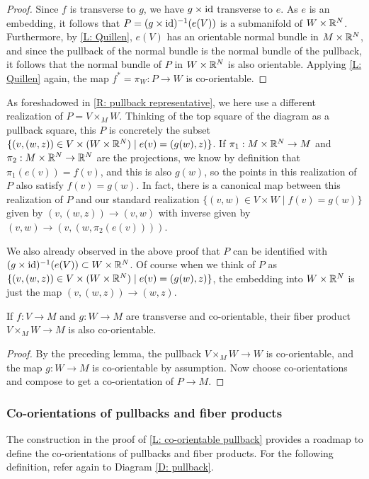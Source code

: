 \begin{proof}
Since $f$ is transverse to $g$, we have $g\times \mathrm{id}$ transverse to $e$. As $e$ is an embedding, it follows that  $P=(g\times \mathrm{id})^{-1}(e(V))$ is a submanifold of $W\times \mathbb{R}^N$. Furthermore, by \cref{L: Quillen}, $e(V)$ has an orientable normal bundle in $M\times \mathbb{R}^N$, and since the pullback of the normal bundle is the normal bundle of the pullback, it follows that the normal bundle of $P$ in $W\times \mathbb{R}^N$ is also orientable. Applying \cref{L: Quillen} again, the map $f^*=\pi_W:P\to W$ is co-orientable. 
\end{proof}

\begin{remark}\label{R: pullback representative 2}
As foreshadowed in \cref{R: pullback representative}, we here use a different realization of $P=V\times_MW$. Thinking of the top square of the diagram as a pullback square, this $P$ is concretely the subset $\{(v,(w,z))\in V\times (W\times \mathbb{R}^N)\mid e(v)=(g(w),z)\}$. If $\pi_1:M\times \mathbb{R}^N\to M$ and $\pi_2:M\times \mathbb{R}^N\to \mathbb{R}^N$ are the projections, we know by definition that $\pi_1(e(v))=f(v)$, and this is also $g(w)$, so the points in this realization of $P$ also satisfy $f(v)=g(w)$. In  fact, there is a canonical map between this realization of $P$ and our standard realization $\{(v,w)\in V\times W\mid f(v)=g(w)\}$ given by $(v,(w,z))\to (v,w)$ with inverse given by $(v,w)\to (v,(w,\pi_2(e(v))))$. 

We also already observed in the above proof that $P$ can be identified with $(g\times \mathrm{id})^{-1}(e(V))\subset W\times \mathbb{R}^N$. Of course when we think of $P$ as $\{(v,(w,z))\in V\times (W\times \mathbb{R}^N)\mid e(v)=(g(w),z)\}$, the embedding into $W\times \mathbb{R}^N$ is just the map $(v,(w,z))\to (w,z)$. 
\end{remark}



\begin{corollary}
If $f:V\to M$ and $g:W\to M$ are transverse and co-orientable, their fiber product $V\times_MW \to M$ is also co-orientable. 
\end{corollary}
\begin{proof}
By the preceding lemma, the pullback $V\times_MW\to W$ is co-orientable, and the map $g:W\to M$ is co-orientable by assumption. Now choose co-orientations and compose to get a co-orientation of $P\to M$.
\end{proof}






\subsubsection{Co-orientations of pullbacks and fiber products}\label{S: co-orientation of pullbacks}
The construction in the proof of \cref{L: co-orientable pullback} provides a roadmap to define the co-orientations of pullbacks and fiber products. For the following definition, refer again to Diagram \eqref{D: pullback}.

